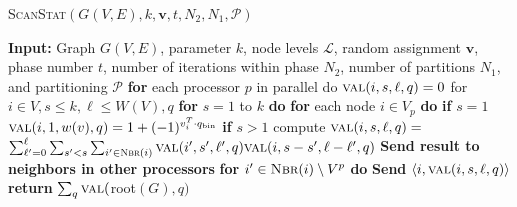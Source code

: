 
\begin{algorithm}{}
\small
\caption{\parcircuit\textsc{ScanStat}{$(G(V, E), k, \mathbf{v}, t, N_2, N_1, \mathcal{P})$}}
\label{alg:parEvaluateScanStat} 
\begin{algorithmic}[1]
\STATE \textbf{Input:} Graph $G(V, E)$, parameter $k$, node levels $\mathcal{L}$, 
random assignment $\mathbf{v}$, phase number $t$, number of iterations within phase $N_2$,
number of partitions $N_1$, and partitioning $\mathcal{P}$
\STATE
\STATE \textbf{for} each processor $p$ in parallel do
\STATE $\textsc{val}(i, s, \ell, q) = 0$ for $i\in V, s \leq k, \ell \leq W(V), q$
\STATE \quad \textbf{for} $s=1$ to $k$ \textbf{do}
\STATE \quad \quad \textbf{for} each node $i\in V_p$ \textbf{do}
\STATE \quad \quad \quad \textbf{if} $s=1$ $ \textsc{val}(i, 1, w(v), q) = 1 + (-1)^{v_i^T \cdot q_{\text{bin}}}$
\STATE \quad \quad \quad \textbf{if} $s>1$ compute $\textsc{val}(i, s, \ell, q) =$
\STATE \quad \quad \quad \quad \quad $\sum_{\ell'=0}^\ell \sum_{s'<s} \sum_{i'\in\textsc{Nbr}(i)} \textsc{val}(i', s', \ell', q)\textsc{val}(i, s-s', \ell - \ell', q)$
\STATE \quad \quad \quad \textbf{Send result to neighbors in other processors}
\STATE \quad \quad \quad \textbf{for} $i' \in \textsc{Nbr}(i) \setminus V^{p}$ \textbf{do}
\STATE \quad \quad \quad \quad \textbf{Send} $\langle i, \textsc{val}(i, s, \ell, q)\rangle$
\STATE \textbf{return} $\sum_q \textsc{val}($root$(G), q)$
\end{algorithmic}
\end{algorithm}